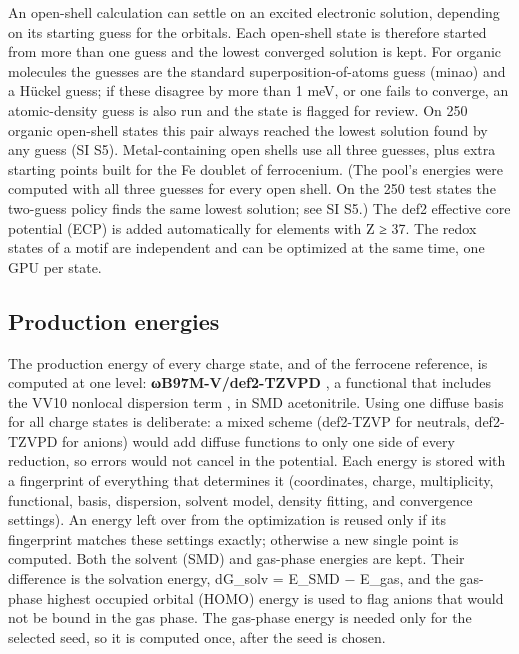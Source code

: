 \documentclass[journal=jcisd8,manuscript=article]{achemso}
\begin{document}
An open-shell calculation can settle on an excited electronic solution, depending on its starting guess for the orbitals. Each open-shell state is therefore started from more than one guess and the lowest converged solution is kept. For organic molecules the guesses are the standard superposition-of-atoms guess (minao) and a Hückel guess; if these disagree by more than 1 meV, or one fails to converge, an atomic-density guess is also run and the state is flagged for review. On 250 organic open-shell states this pair always reached the lowest solution found by any guess (SI S5). Metal-containing open shells use all three guesses, plus extra starting points built for the Fe doublet of ferrocenium. (The pool's energies were computed with all three guesses for every open shell. On the 250 test states the two-guess policy finds the same lowest solution; see SI S5.) The def2 effective core potential (ECP) \cite{weigend2005} is added automatically for elements with Z ≥ 37. The redox states of a motif are independent and can be optimized at the same time, one GPU per state.

\subsection{Production energies}

The production energy of every charge state, and of the ferrocene reference, is computed at one level: \textbf{ωB97M-V/def2-TZVPD} \cite{mardirossian2016,rappoport2010}, a functional that includes the VV10 nonlocal dispersion term \cite{vydrov2010}, in SMD acetonitrile. Using one diffuse basis for all charge states is deliberate: a mixed scheme (def2-TZVP for neutrals, def2-TZVPD for anions) would add diffuse functions to only one side of every reduction, so errors would not cancel in the potential. Each energy is stored with a fingerprint of everything that determines it (coordinates, charge, multiplicity, functional, basis, dispersion, solvent model, density fitting, and convergence settings). An energy left over from the optimization is reused only if its fingerprint matches these settings exactly; otherwise a new single point is computed. Both the solvent (SMD) and gas-phase energies are kept. Their difference is the solvation energy, dG\_solv = E\_SMD − E\_gas, and the gas-phase highest occupied orbital (HOMO) energy is used to flag anions that would not be bound in the gas phase. The gas-phase energy is needed only for the selected seed, so it is computed once, after the seed is chosen.
\end{document}

